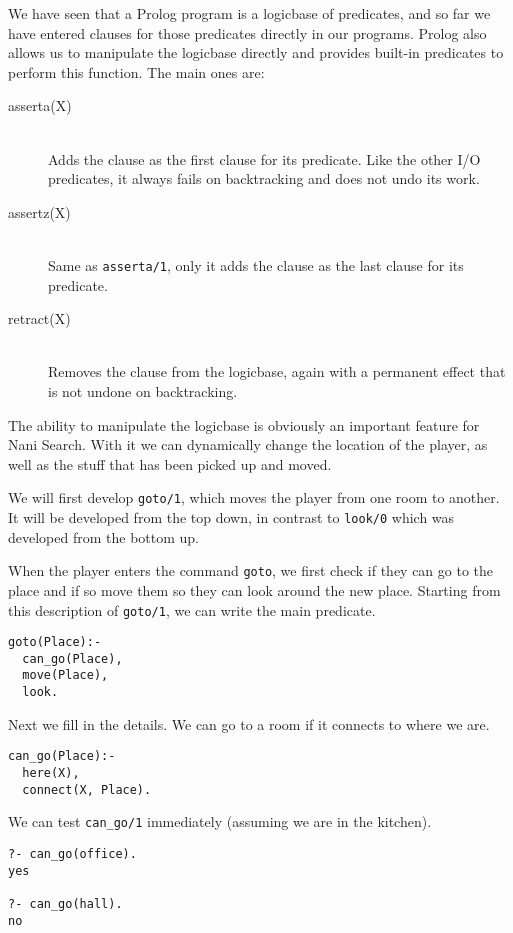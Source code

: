 \secdown

We have seen that a Prolog program is a logicbase of predicates, and so far we
have entered clauses for those predicates directly in our programs. Prolog also
allows us to manipulate the logicbase directly and provides built-in predicates
to perform this function. The main ones are:

\begin{description}
\item[asserta(X)]\ \\
Adds the clause  as the first clause for its predicate. Like the other
I/O predicates, it always fails on backtracking and does not undo its work.
\item[assertz(X)]\ \\
Same as \verb'asserta/1', only it adds the clause  as the last clause for
its predicate.
\item[retract(X)]\ \\
Removes the clause  from the logicbase, again with a permanent effect
that is not undone on backtracking.
\end{description}

The ability to manipulate the logicbase is obviously an important feature for
Nani Search. With it we can dynamically change the location of the player, as
well as the stuff that has been picked up and moved.

We will first develop \verb'goto/1', which moves the player from one room to
another. It will be developed from the top down, in contrast to \verb'look/0'
which was developed from the bottom up.

When the player enters the command \verb'goto', we first check if they can go to
the place and if so move them so they can look around the new place. Starting
from this description of \verb'goto/1', we can write the main predicate.
\begin{verbatim}
goto(Place):-  
  can_go(Place),
  move(Place),
  look.
\end{verbatim}

Next we fill in the details. We can go to a room if it connects to where we are.
\begin{verbatim}
can_go(Place):- 
  here(X),
  connect(X, Place).
\end{verbatim}

We can test \verb'can_go/1' immediately (assuming we are in the kitchen).

\begin{verbatim}
?- can_go(office).
yes

?- can_go(hall).
no
\end{verbatim}

